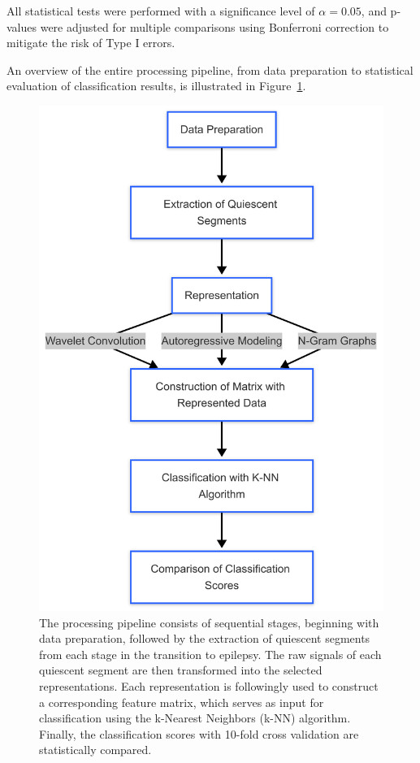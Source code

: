 \documentclass{article}
\begin{document}
All statistical tests were performed with a significance level of $\alpha = 0.05$, and p-values were adjusted for multiple comparisons using Bonferroni correction to mitigate the risk of Type I errors.

An overview of the entire processing pipeline, from data preparation to statistical evaluation of classification results, is illustrated in Figure~\ref{fig:pipeline}.

\begin{figure}[htbp]
	\centering
	\includegraphics[width=0.9\linewidth]{PIPES.png}
	\caption{The processing pipeline consists of sequential stages, beginning with data preparation, followed by the extraction of quiescent segments from each stage in the transition to epilepsy. The raw signals of each quiescent segment are then transformed into the selected representations. Each representation is followingly used to construct a corresponding feature matrix, which serves as input for classification using the k-Nearest Neighbors (k-NN) algorithm. Finally, the classification scores with 10-fold cross validation are statistically compared.}
	\label{fig:pipeline}
\end{figure}
\end{document}
